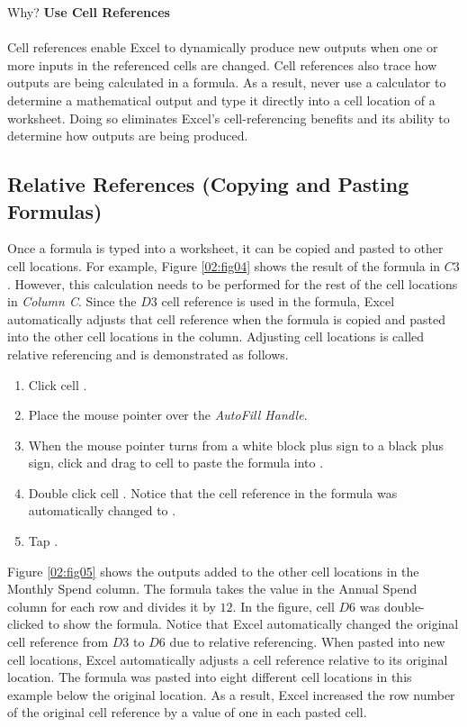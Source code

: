 \begin{center}
	\begin{infobox}{Why?}
		\textbf{Use Cell References}
		\\
		\\
		Cell references enable Excel to dynamically produce new outputs when one or more inputs in the referenced cells are changed. Cell references also trace how outputs are being calculated in a formula. As a result, never use a calculator to determine a mathematical output and type it directly into a cell location of a worksheet. Doing so eliminates Excel's cell-referencing benefits and its ability to determine how outputs are being produced.
	\end{infobox}
\end{center}

\subsection{Relative References (Copying and Pasting Formulas)}

Once a formula is typed into a worksheet, it can be copied and pasted to other cell locations. For example, Figure \ref{02:fig04} shows the result of the formula in $ C3 $. However, this calculation needs to be performed for the rest of the cell locations in \textit{Column C}. Since the $ D3 $ cell reference is used in the formula, Excel automatically adjusts that cell reference when the formula is copied and pasted into the other cell locations in the column. Adjusting cell locations is called relative referencing and is demonstrated as follows.

\begin{enumbox}
	\begin{enumerate}
		\item Click cell .
		\item Place the mouse pointer over the \textit{AutoFill Handle}.
		\item When the mouse pointer turns from a white block plus sign to a black plus sign, click and drag to cell  to paste the formula into .
		\item Double click cell . Notice that the cell reference in the formula was automatically changed to .
		\item Tap .
	\end{enumerate}
\end{enumbox}

Figure \ref{02:fig05} shows the outputs added to the other cell locations in the Monthly Spend column. The formula takes the value in the Annual Spend column for each row and divides it by $ 12 $. In the figure, cell $ D6 $ was double-clicked to show the formula. Notice that Excel automatically changed the original cell reference from $ D3 $ to $ D6 $ due to relative referencing. When pasted into new cell locations, Excel automatically adjusts a cell reference relative to its original location. The formula was pasted into eight different cell locations in this example below the original location. As a result, Excel increased the row number of the original cell reference by a value of one in each pasted cell.

